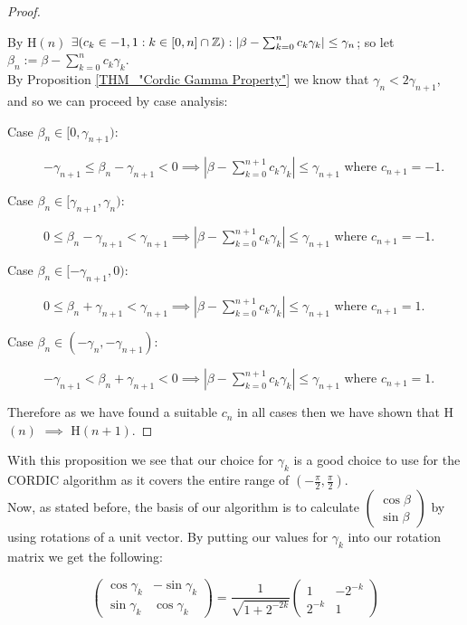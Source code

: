 {\begin{proof}
\begin{description}
	By \textrm{H\((n)\)} \(\exists (c_k \in {-1,1} : k \in [0,n] \cap \mathbb{Z}) : |\beta - \sum_{k=0}^nc_k\gamma_k| \le \gamma_n\); so let \(\beta_n := \beta - \sum_{k=0}^nc_k\gamma_k\).\\
	By Proposition \ref{THM_"Cordic Gamma Property"} we know that \(\gamma_n < 2\gamma_{n+1}\), and so we can proceed by case analysis:
	\begin{description}
	\item[Case \(\beta_n \in [0, \gamma_{n+1})\):]\hfill\break
		\(-\gamma_{n+1} \le \beta_n - \gamma_{n+1} < 0 \implies |\beta - \sum_{k=0}^{n+1}c_k\gamma_k| \le \gamma_{n+1}\) where \(c_{n+1} = -1\).
	\item[Case \(\beta_n \in [\gamma_{n+1}, \gamma_n)\):]\hfill\break
		\(0 \le \beta_n - \gamma_{n+1} < \gamma_{n+1} \implies |\beta - \sum_{k=0}^{n+1}c_k\gamma_k| \le \gamma_{n+1}\) where \(c_{n+1} = -1\).
	\item[Case \(\beta_n \in [-\gamma_{n+1}, 0)\):]\hfill\break
		\(0 \le \beta_n + \gamma_{n+1} < \gamma_{n+1} \implies |\beta - \sum_{k=0}^{n+1}c_k\gamma_k| \le \gamma_{n+1}\) where \(c_{n+1} = 1\).
	\item[Case \(\beta_n \in (-\gamma_n, -\gamma_{n+1})\):]\hfill\break
		\(-\gamma_{n+1} < \beta_n + \gamma_{n+1} < 0 \implies |\beta - \sum_{k=0}^{n+1}c_k\gamma_k| \le \gamma_{n+1}\) where \(c_{n+1} = 1\).
	\end{description}
\end{description}
	Therefore as we have found a suitable \(c_n\) in all cases then we have shown that \textrm{H\((n)\) \(\implies\) H\((n+1)\)}.
\end{proof}

With this proposition we see that our choice for \(\gamma_k\) is a good choice to use for the CORDIC algorithm as it covers the entire range of \((-\frac{\pi}{2}, \frac{\pi}{2})\).\\

Now, as stated before, the basis of our algorithm is to calculate \(\left(\begin{array}{c}\cos\beta\\\sin\beta\end{array}\right)\) by using rotations of a unit vector. By putting our values for \(\gamma_k\) into our rotation matrix we get the following:

\begin{displaymath}
\left(\begin{array}{cc}
	\cos\gamma_k & -\sin\gamma_k\\
	\sin\gamma_k & \cos\gamma_k
	\end{array}\right)
= \frac{1}{\sqrt{1 + 2^{-2k}}}
\left(\begin{array}{cc}
	1 & -2^{-k}\\
	2^{-k} & 1
\end{array}\right)
\end{displaymath}

}
